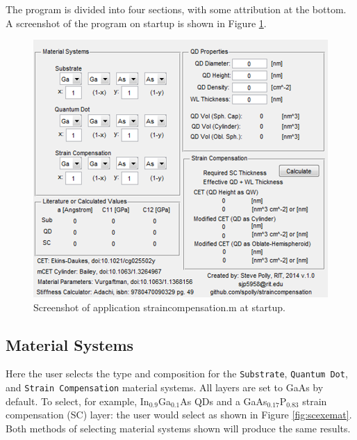 \documentclass{article}
\begin{document}
The program is divided into four sections, with some attribution at the bottom. A screenshot of the program on startup is shown in Figure \ref{fig:scexe}.

\begin{figure}
	\includegraphics[width=0.85\linewidth]{scexe}
	\centering
	\caption{Screenshot of application straincompensation.m at startup.}
	\label{fig:scexe}
\end{figure}

\subsection{Material Systems}
Here the user selects the type and composition for the \texttt{Substrate}, \texttt{Quantum Dot}, and \texttt{Strain Compensation} material systems. All layers are set to GaAs by default. To select, for example, In$_{0.9}$Ga$_{0.1}$As QDs and a GaAs$_{0.17}$P$_{0.83}$ strain compensation (SC) layer: the user would select as shown in Figure \ref{fig:scexemat}. Both methods of selecting material systems shown will produce the same results. 
\end{document}
